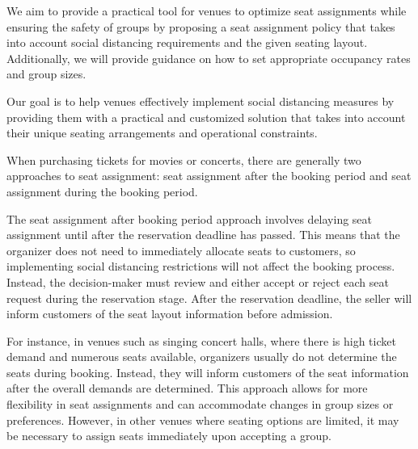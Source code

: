 We aim to provide a practical tool for venues to optimize seat assignments while ensuring the safety of groups by proposing a seat assignment policy that takes into account social distancing requirements and the given seating layout. Additionally, we will provide guidance on how to set appropriate occupancy rates and group sizes.

Our goal is to help venues effectively implement social distancing measures by providing them with a practical and customized solution that takes into account their unique seating arrangements and operational constraints.




When purchasing tickets for movies or concerts, there are generally two approaches to seat assignment: seat assignment after the booking period and seat assignment during the booking period.

The seat assignment after booking period approach involves delaying seat assignment until after the reservation deadline has passed. This means that the organizer does not need to immediately allocate seats to customers, so implementing social distancing restrictions will not affect the booking process. Instead, the decision-maker must review and either accept or reject each seat request during the reservation stage. After the reservation deadline, the seller will inform customers of the seat layout information before admission.

For instance, in venues such as singing concert halls, where there is high ticket demand and numerous seats available, organizers usually do not determine the seats during booking. Instead, they will inform customers of the seat information after the overall demands are determined. This approach allows for more flexibility in seat assignments and can accommodate changes in group sizes or preferences. However, in other venues where seating options are limited, it may be necessary to assign seats immediately upon accepting a group.



